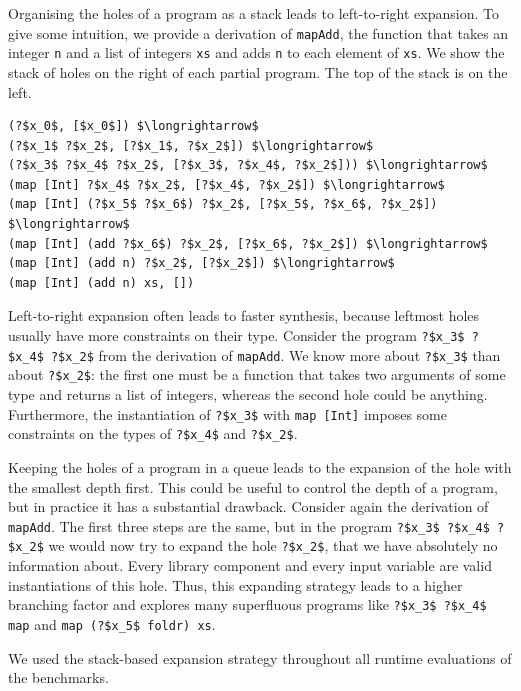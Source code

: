 Organising the holes of a program as a stack leads to left-to-right expansion. To give some intuition, we provide a derivation of \lstinline?mapAdd?, the function that takes an integer \lstinline!n! and a list of integers \lstinline!xs! and adds \lstinline!n! to each element of \lstinline!xs!. We show the stack of holes on the right of each partial program. The top of the stack is on the left.
\begin{lstlisting}[style=plain]
(?$x_0$, [$x_0$]) $\longrightarrow$
(?$x_1$ ?$x_2$, [?$x_1$, ?$x_2$]) $\longrightarrow$
(?$x_3$ ?$x_4$ ?$x_2$, [?$x_3$, ?$x_4$, ?$x_2$])) $\longrightarrow$
(map [Int] ?$x_4$ ?$x_2$, [?$x_4$, ?$x_2$]) $\longrightarrow$
(map [Int] (?$x_5$ ?$x_6$) ?$x_2$, [?$x_5$, ?$x_6$, ?$x_2$]) $\longrightarrow$
(map [Int] (add ?$x_6$) ?$x_2$, [?$x_6$, ?$x_2$]) $\longrightarrow$
(map [Int] (add n) ?$x_2$, [?$x_2$]) $\longrightarrow$
(map [Int] (add n) xs, [])
\end{lstlisting}
Left-to-right expansion often leads to faster synthesis, because leftmost holes usually have more constraints on their type. Consider the program \lstinline!?$x_3$ ?$x_4$ ?$x_2$! from the derivation of \lstinline?mapAdd?. We know more about \lstinline!?$x_3$! than about \lstinline!?$x_2$!: the first one must be a function that takes two arguments of some type and returns a list of integers, whereas the second hole could be anything. Furthermore, the instantiation of \lstinline!?$x_3$! with \lstinline?map [Int]? imposes some constraints on the types of \lstinline!?$x_4$! and \lstinline!?$x_2$!.

Keeping the holes of a program in a queue leads to the expansion of the hole with the smallest depth first. This could be useful to control the depth of a program, but in practice it has a substantial drawback. Consider again the derivation of \lstinline?mapAdd?. The first three steps are the same, but in the program \lstinline!?$x_3$ ?$x_4$ ?$x_2$! we would now try to expand the hole \lstinline!?$x_2$!, that we have absolutely no information about. Every library component and every input variable are valid instantiations of this hole. Thus, this expanding strategy leads to a higher branching factor and explores many superfluous programs like \lstinline!?$x_3$ ?$x_4$ map! and \lstinline!map (?$x_5$ foldr) xs!.

We used the stack-based expansion strategy throughout all runtime evaluations of the benchmarks.


